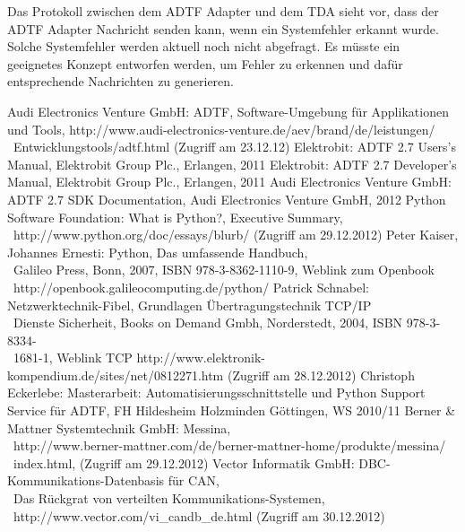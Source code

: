 \documentclass[12pt,a4paper]{report}
\begin{document}
Das Protokoll zwischen dem ADTF Adapter und dem TDA sieht vor, dass der ADTF Adapter Nachricht senden kann, wenn ein Systemfehler erkannt wurde. Solche Systemfehler werden aktuell noch nicht abgefragt. Es müsste ein geeignetes Konzept entworfen werden, um Fehler zu erkennen und dafür entsprechende Nachrichten zu generieren.
\begin{thebibliography}{99}
Audi Electronics Venture GmbH: ADTF, Software-Umgebung für Applikationen und Tools, http://www.audi-electronics-venture.de/aev/brand/de/leistungen/
\\\ Entwicklungstools/adtf.html (Zugriff am 23.12.12)
Elektrobit: ADTF 2.7 Users's Manual, Elektrobit Group Plc., Erlangen, 2011
Elektrobit: ADTF 2.7 Developer's Manual, Elektrobit Group Plc., Erlangen, 2011
Audi Electronics Venture GmbH: ADTF 2.7 SDK Documentation, Audi Electronics Venture GmbH, 2012
Python Software Foundation: What is Python?, Executive Summary,
\\\ http://www.python.org/doc/essays/blurb/ (Zugriff am 29.12.2012)
Peter Kaiser, Johannes Ernesti: Python, Das umfassende Handbuch,
\\\ Galileo Press, Bonn, 2007, ISBN 978-3-8362-1110-9, Weblink zum Openbook 
\\\ http://openbook.galileocomputing.de/python/
Patrick Schnabel: Netzwerktechnik-Fibel, Grundlagen Übertragungstechnik TCP/IP 
\\\ Dienste Sicherheit, Books on Demand Gmbh, Norderstedt, 2004, ISBN 978-3-8334-
\\\ 1681-1, Weblink TCP  http://www.elektronik-kompendium.de/sites/net/0812271.htm (Zugriff am 28.12.2012)
Christoph Eckerlebe: Masterarbeit: Automatisierungsschnittstelle und Python Support Service für ADTF, FH Hildesheim Holzminden Göttingen, WS 2010/11
Berner \& Mattner Systemtechnik GmbH: Messina,
\\\ http://www.berner-mattner.com/de/berner-mattner-home/produkte/messina/
\\\ index.html, (Zugriff am 29.12.2012)
Vector Informatik GmbH: DBC-Kommunikations-Datenbasis für CAN,
\\\ Das Rückgrat von verteilten Kommunikations-Systemen, 
\\\ http://www.vector.com/vi\_candb\_de.html (Zugriff am 30.12.2012)

\end{thebibliography}
\end{document}
